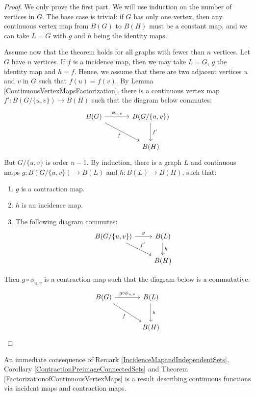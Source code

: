 \documentclass{amsart}
\theoremstyle{definition}
\theoremstyle{remark}
\numberwithin{equation}{section}
\begin{document}
	\begin{proof}
		We only prove the first part. We will use induction on the number of vertices in \(G\). The base case is trivial: if \(G\) has only one vertex, then any continuous vertex map from \(B(G)\) to \(B(H)\) must be a constant map, and we can take \(L = G\) with \(g\) and \(h\) being the identity maps.
		
		Assume now that the theorem holds for all graphs with fewer than \(n\) vertices. Let \(G\) have \(n\) vertices. If \(f\) is a incidence map, then we may take \(L=G\), \(g\) the identity map and \(h=f\). Hence, we assume that there are two adjacent vertices \(u\) and \(v\) in \(G\) such that \(f(u)=f(v)\). By Lemma \ref{ContinuousVertexMapsFactorization}, there is a continuous vertex map \(f':B(G/\{u,v\}) \rightarrow B(H)\) such that the diagram below commutes:
		\[
		\begin{tikzcd}[column sep=large, row sep=large]
			B(G) \arrow[r, "\phi_{u,v}"] \arrow[rd, "f"'] & B(G/\{u,v\}) \arrow[d, "f'"] \\
			& B(H)
		\end{tikzcd}
		\]
		But \(G/\{u,v\}\) is order \(n-1\). By induction, there is a graph \(L\) and continuous maps \(g: B(G/\{u,v\}) \to B(L)\) and \(h: B(L) \to B(H)\), such that:
		\begin{enumerate}
			\item \(g\) is a contraction map.
			\item \(h\) is an incidence map.
			\item The following diagram commutes:
			\[
			\begin{tikzcd}
				B(G/\{u,v\}) \arrow[r,"g"] \arrow[rd, "f'"] & B(L) \arrow[d, "h"] \\
				& B(H)
			\end{tikzcd}
			\]
		\end{enumerate}
		Then \(g \circ \phi_{u,v}\) is a contraction map such that the diagram below is a commutative.
		\[
		\begin{tikzcd}[column sep=large, row sep=large]
			B(G) \arrow[r, "g \circ \phi_{u,v}"] \arrow[rd, "f"'] & B(L) \arrow[d, "h"] \\
			& B(H)
		\end{tikzcd}
		\]
	\end{proof}
	
	An immediate consequence of Remark \ref{IncidenceMapandIndependentSets}, Corollary \ref{ContractionPreimageConnectedSets} and Theorem \ref{FactorizationofContinuousVertexMaps} is a result describing continuous functions via incident maps and contraction maps.
	
\end{document}
